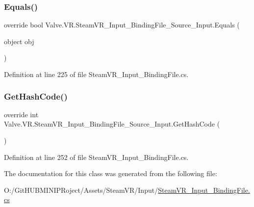 \subsubsection{\texorpdfstring{Equals()}{Equals()}}
{\footnotesize\ttfamily override bool Valve.\+V\+R.\+Steam\+V\+R\+\_\+\+Input\+\_\+\+Binding\+File\+\_\+\+Source\+\_\+\+Input.\+Equals (\begin{DoxyParamCaption}\item[{object}]{obj }\end{DoxyParamCaption})}



Definition at line 225 of file Steam\+V\+R\+\_\+\+Input\+\_\+\+Binding\+File.\+cs.

\mbox{\label{class_valve_1_1_v_r_1_1_steam_v_r___input___binding_file___source___input_a25a588fadf339725ea84266038f7aca5}} 
\subsubsection{\texorpdfstring{GetHashCode()}{GetHashCode()}}
{\footnotesize\ttfamily override int Valve.\+V\+R.\+Steam\+V\+R\+\_\+\+Input\+\_\+\+Binding\+File\+\_\+\+Source\+\_\+\+Input.\+Get\+Hash\+Code (\begin{DoxyParamCaption}{ }\end{DoxyParamCaption})}



Definition at line 252 of file Steam\+V\+R\+\_\+\+Input\+\_\+\+Binding\+File.\+cs.



The documentation for this class was generated from the following file\+:\begin{DoxyCompactItemize}
\item 
O\+:/\+Git\+H\+U\+B\+M\+I\+N\+I\+P\+Roject/\+Assets/\+Steam\+V\+R/\+Input/\mbox{\hyperlink{_steam_v_r___input___binding_file_8cs}{Steam\+V\+R\+\_\+\+Input\+\_\+\+Binding\+File.\+cs}}\end{DoxyCompactItemize}
